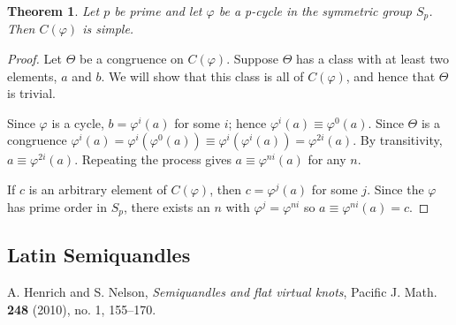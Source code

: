 \documentclass{amsart}
\newtheorem{thm}{Theorem}[section]
\theoremstyle{definition}
\numberwithin{equation}{section}
\begin{document}
\begin{thm}
Let $p$ be prime and let $\varphi$ be a p-cycle in the symmetric group $S_p$.
Then $C(\varphi)$ is simple.
\end{thm}

\begin{proof}
Let $\Theta$ be a congruence on $C(\varphi)$. Suppose $\Theta$ has
a class with at least two elements, $a$ and $b$. We will show that
this class is all of $C(\varphi)$, and hence that $\Theta$ is
trivial.

Since $\varphi$ is a cycle, $b = \varphi^{i}(a)$ for some $i$; hence
$\varphi^{i}(a) \equiv \varphi^{0}(a)$. Since $\Theta$ is a congruence
$\varphi^{i}(a) = \varphi^{i}(\varphi^{0}(a)) \equiv
\varphi^{i}(\varphi^{i}(a)) = \varphi^{2i}(a)$. By transitivity,
$a \equiv \varphi^{2i}(a)$. Repeating the process gives $a \equiv
\varphi^{ni}(a)$ for any $n$.

If $c$ is an arbitrary element of $C(\varphi)$, then $c = \varphi^{j}(a)$
for some $j$.  Since the $\varphi$ has prime order in $S_p$, there
exists an $n$ with $\varphi^{j} = \varphi^{ni}$ so $a \equiv
\varphi^{ni}(a) = c$.
\end{proof}

\subsection{Latin Semiquandles}


\begin{thebibliography}{9}

      A. Henrich and S. Nelson, \emph{Semiquandles and flat virtual
      knots}, Pacific J. Math. \textbf{248} (2010), no. 1, 155--170.

\end{thebibliography}
\end{document}
